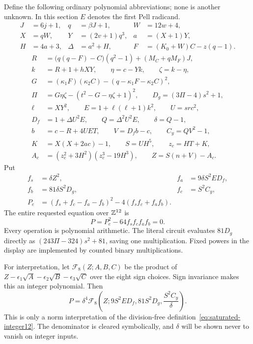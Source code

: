 Define the following ordinary polynomial abbreviations; none is another
unknown.  In this section $E$ denotes the first Pell radicand.
\begin{align*}
 J&=6j+1,&q&=\beta J+1,&W&=12w+4,\\
 X&=qW,&Y&=(2v+1)q^3,&a&=(X+1)Y,\\
 H&=4a+3,&\Delta&=a^2+H,&F&=(K_0+W)C-z(q-1).
\end{align*}
\begin{align*}
 R&=\bigl(q(q-F)-C\bigr)(q^2-1)+(M_C+qM_F)J,\\
 k&=R+1+hXY,\qquad \eta=c-Yk,\qquad\zeta=k-\eta,\\
 G&=(\kappa_1F)(\kappa_2C)-(q-\kappa_1F-\kappa_2C)^2,\\
 \Pi&=G\eta\zeta-(t^2-G-\eta\zeta+1)^2,\qquad
 D_g=(3\Pi-4)s^2+1,\\
 \ell&=XY^2,\qquad E=1+\ell(\ell+1)k^2,\qquad U=src^2,\\
 D_f&=1+\Delta U^2E,\qquad Q=\Delta^2U^2E,\qquad\delta=Q-1,\\
 b&=c-R+4UET,\qquad V=D_fb-c,\qquad C_y=QV^2-1,\\
 K&=X(X+2ac)-1,\qquad S=UH^5,\qquad z_c=HT+K,\\
 A_c&=(z_c^2+3H^2)(z_c^3-19H^3),\qquad Z=S(n+V)-A_c.
\end{align*}
Put
\begin{align*}
 f_s&=\delta Z^2,& f_a&=9\delta S^2ED_f,\\
 f_b&=81\delta S^2D_g,& f_c&=S^2C_y,\\
 P_e&=(f_s+f_c-f_a-f_b)^2-4(f_sf_c+f_af_b).
\end{align*}
The entire requested equation over $\mathbb Z^{12}$ is
\begin{equation}
 \boxed{\quad P=P_e^2-64f_sf_cf_af_b=0.\quad}
 \label{eq:saturated-integer12}
\end{equation}
Every operation is polynomial arithmetic.  The literal circuit evaluates
$81D_g$ directly as $(243\Pi-324)s^2+81$, saving one multiplication.
Fixed powers in the display are implemented by counted binary
multiplications.

For interpretation, let $\mathcal F_8(Z;A,B,C)$ be the product of
$Z-\epsilon_1\sqrt A-\epsilon_2\sqrt B-\epsilon_3\sqrt C$ over the eight
sign choices.  Sign invariance makes this an integer polynomial.  Then
\begin{equation}
 P=\delta^4\mathcal F_8\left(
 Z;9S^2ED_f,81S^2D_g,\frac{S^2C_y}{\delta}\right).
 \label{eq:saturated-integer12-norm}
\end{equation}
This is only a norm interpretation of the division-free
definition~\eqref{eq:saturated-integer12}.  The denominator is cleared
symbolically, and $\delta$ will be shown never to vanish on integer inputs.

